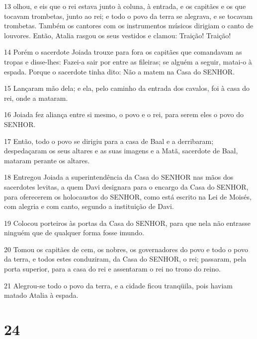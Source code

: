 \par 13 olhou, e eis que o rei estava junto à coluna, à entrada, e os capitães e os que tocavam trombetas, junto ao rei; e todo o povo da terra se alegrava, e se tocavam trombetas. Também os cantores com os instrumentos músicos dirigiam o canto de louvores. Então, Atalia rasgou os seus vestidos e clamou: Traição! Traição!
\par 14 Porém o sacerdote Joiada trouxe para fora os capitães que comandavam as tropas e disse-lhes: Fazei-a sair por entre as fileiras; se alguém a seguir, matai-o à espada. Porque o sacerdote tinha dito: Não a matem na Casa do SENHOR.
\par 15 Lançaram mão dela; e ela, pelo caminho da entrada dos cavalos, foi à casa do rei, onde a mataram.
\par 16 Joiada fez aliança entre si mesmo, o povo e o rei, para serem eles o povo do SENHOR.
\par 17 Então, todo o povo se dirigiu para a casa de Baal e a derribaram; despedaçaram os seus altares e as suas imagens e a Matã, sacerdote de Baal, mataram perante os altares.
\par 18 Entregou Joiada a superintendência da Casa do SENHOR nas mãos dos sacerdotes levitas, a quem Davi designara para o encargo da Casa do SENHOR, para oferecerem os holocaustos do SENHOR, como está escrito na Lei de Moisés, com alegria e com canto, segundo a instituição de Davi.
\par 19 Colocou porteiros às portas da Casa do SENHOR, para que nela não entrasse ninguém que de qualquer forma fosse imundo.
\par 20 Tomou os capitães de cem, os nobres, os governadores do povo e todo o povo da terra, e todos estes conduziram, da Casa do SENHOR, o rei; passaram, pela porta superior, para a casa do rei e assentaram o rei no trono do reino.
\par 21 Alegrou-se todo o povo da terra, e a cidade ficou tranqüila, pois haviam matado Atalia à espada.

\chapter{24}


